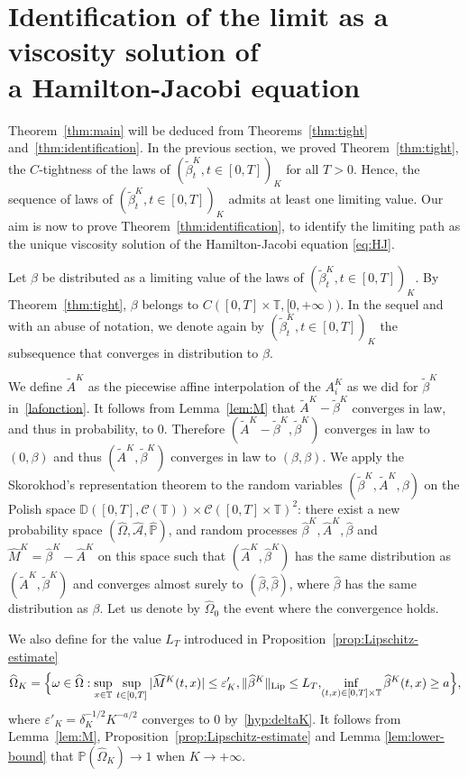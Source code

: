 \documentclass[10pt]{amsart}
\let\cal\mathcal
\let\sep:
\theoremstyle{plain}
\theoremstyle{remark}
\newcommand\T{\mathbb{T}}
\renewcommand\P{\mathbb{P}}
\begin{document}
\section{Identification of the limit as a viscosity solution of\\ a Hamilton-Jacobi equation}\label{sec:identif}

Theorem~\ref{thm:main} will be deduced from Theorems~\ref{thm:tight} and~\ref{thm:identification}.
In the previous section, we proved Theorem~\ref{thm:tight}, \ie the $C$-tightness of the laws of $(\widetilde \beta^K_{t}, t\in[0,T])_{K}$ for all $T>0$. Hence, the sequence of laws of $(\widetilde \beta^K_{t}, t\in[0,T])_{K}$ admits at least one limiting value. Our aim is now to prove Theorem~\ref{thm:identification}, \ie to identify the limiting path as the unique viscosity solution of the Hamilton-Jacobi equation \eqref{eq:HJ}.

Let $\beta$ be distributed as a limiting value of the laws of $(\tilde \beta^K_{t}, t\in {[0,T]})_{K}$. By Theorem~\ref{thm:tight}, $\beta$ belongs to $C([0,T]\times\T,[0,+\infty))$. In the sequel and with an abuse of notation, we denote again by $(\tilde \beta^K_{t}, t\in[0,T])_{K}$ the subsequence that converges in distribution to $\beta$.

We define $\widetilde{A}^K$ as the piecewise affine interpolation of the $A^K_i$ as we did for $\widetilde{\beta}^K$ in~\eqref{lafonction}. It follows from Lemma~\ref{lem:M} that
$
\widetilde{A}^K-\widetilde{\beta}^K
$ converges in law, and thus in probability, to $0$. Therefore $(\widetilde{A}^K-\widetilde{\beta}^K,\widetilde{\beta}^K)$ converges in law to $(0, \beta)$ and thus $(\widetilde{A}^K,\widetilde{\beta}^K)$ converges in law to $(\beta, \beta)$.
We apply the Skorokhod's representation theorem to the random variables $(\widetilde{\beta}^K,\widetilde{A}^K,\beta)$ on the Polish space $\mathbb{D}([0,T],{\cal C}(\mathbb{T}))\times{\cal C}([0,T]\times\mathbb{T})^2$: there exist a new probability space $(\widehat{\Omega},\widehat{\mathcal{A}},\widehat{\mathbb{P}})$, and random processes $\widehat{\beta}^K,\widehat{A}^K,\widehat{\beta}$ and $\widehat{M}^K=\widehat{\beta}^K-\widehat{A}^K$ on this space such that $(\widehat{A}^K,\widehat{\beta}^K)$ has the same distribution as $(\widetilde{A}^K,\widetilde{\beta}^K)$ and converges almost surely to $(\widehat{\beta}, \widehat{\beta})$, where $\widehat{\beta}$ has the same distribution as $\beta$. Let us denote by $\widehat{\Omega}_0$ the event where the convergence holds.

We also define for the value $L_T$ introduced in Proposition~\ref{prop:Lipschitz-estimate}
\[
\widehat{\Omega}_K=\Bigl\{\omega\in \widehat{\Omega} \sep \sup_{x\in\T}\,\sup_{t\in[0,T]}|\widehat{M}^K(t,x)|\leq \varepsilon'_K,
\|\widehat{\beta}^K\|_\text{Lip}\leq L_T,\! \inf_{(t,x)\in[0,T]\times\mathbb{T}} \widehat{\beta}^K(t,x)\geq a \Bigr\},
\]
where $\varepsilon'_K=\delta_K^{-1/2} K^{-a/2}$ converges to 0 by~\eqref{hyp:deltaK}.
It follows from Lemma~\ref{lem:M}, Proposition~\ref{prop:Lipschitz-estimate} and Lemma \ref{lem:lower-bound} that $\P(\widehat{\Omega}_K)\to 1$ when $K\to +\infty$.
\end{document}
